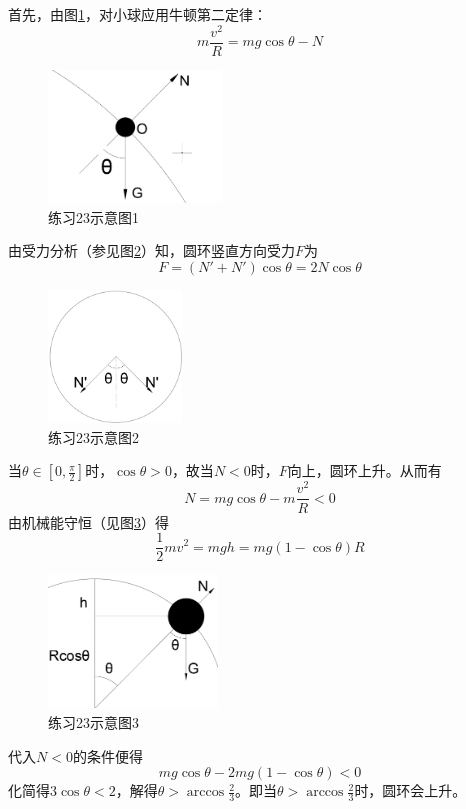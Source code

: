 \documentclass[b5paper,opensource,sourcefont,parskip]{qyxf-book}
\begin{document}

\solve 首先，由图\ref{fig:t23-1}，对小球应用牛顿第二定律：
\[m\dfrac{v^2}{R}=mg\cos\theta-N\]

\begin{figure}[htbp]
\centering
\includegraphics[height=100pt]{Chp2_illus2.png}
\caption{练习23示意图1}\label{fig:t23-1}
\end{figure}

由受力分析（参见图\ref{fig:t23-2}）知，圆环竖直方向受力$F$为
\[
F=(N'+N')\cos\theta=2N\cos\theta
\]

\begin{figure}[htbp]
\centering
\includegraphics[height=100pt]{Chp2_illus3.png}
\caption{练习23示意图2}\label{fig:t23-2}
\end{figure}

当$\theta\in[0,\frac{\pi}{2}]$时，$\cos\theta>0$，故当$N<0$时，$F$向上，圆环上升。从而有
\[N=mg\cos\theta-m\frac{v^2}{R}<0\]
由机械能守恒（见图\ref{fig:t23-3}）得
\[\frac{1}{2}mv^2=mgh=mg(1-\cos\theta)R\]

\begin{figure}[htbp]
\centering
\includegraphics[height=100pt]{Chp2_illus4.png}
\caption{练习23示意图3}\label{fig:t23-3}
\end{figure}

代入$N<0$的条件便得
\[mg\cos\theta-2mg(1-\cos\theta)<0\]
化简得$3\cos\theta<2$，解得$\theta>\arccos\frac{2}{3}$。即当$\theta>\arccos\frac{2}{3}$时，圆环会上升。
\end{document}
